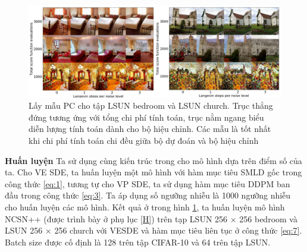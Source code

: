 \documentclass{article} %
\begin{document}
\begin{figure}[h!]
    \centering
    \includegraphics[width=0.8\linewidth]{figures/9.png}
    \caption{Lấy mẫu PC cho tập LSUN bedroom và LSUN church.
    Trục thẳng đứng tương ứng với tổng chi phí tính toán, trục nằm ngang biểu diễn lượng tính toán dành cho bộ hiệu chỉnh.
    Các mẫu là tốt nhất khi chi phí tính toán chi đều giữa bộ dự đoán và bộ hiệu chỉnh}
    \label{fig:9}
\end{figure}

\textbf{Huấn luyện} Ta sử dụng cùng kiến trúc trong \citep{ho2020denoising} cho mô hình dựa trên điểm số của ta.
Cho VE SDE, ta huấn luyện một mô hình với hàm mục tiêu SMLD gốc trong công thức \ref{eq:1}, tương tự cho VP SDE,
ta sử dụng hàm mục tiêu DDPM ban đầu trong công thức \ref{eq:3}.
Ta áp dụng số ngưỡng nhiễu là 1000 ngưỡng nhiễu cho huấn luyện các mô hình.
Kết quả ở trong hình \ref{fig:9}, ta huấn luyện mô hình NCSN++ (được trình bày ở phụ lục \ref{H}) trên tạp LSUN 256 $\times$ 256 bedroom và LSUN 256 $\times$ 256 church \citep{yu2015lsun} với VESDE và hàm mục tiêu liên tục ở công thức \ref{eq:7}.
Batch size được cố định là 128 trên tập CIFAR-10 và 64 trên tập LSUN.
\end{document}
